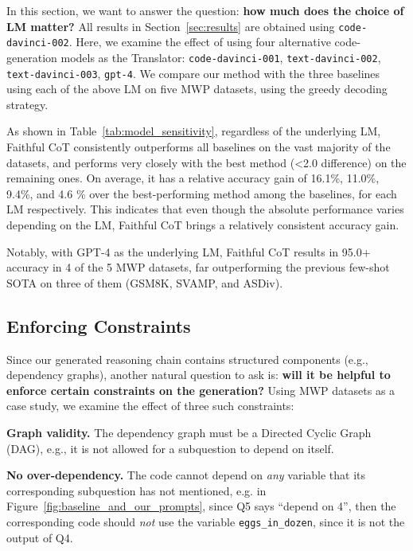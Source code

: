 \documentclass[11pt]{article}
\begin{document}
In this section, we want to answer the question: \textbf{how much does the choice of LM matter?} All results in Section~\ref{sec:results} are obtained using \texttt{code-davinci-002}. Here, we examine the effect of using four alternative code-generation models as the Translator: \texttt{code-davinci-001}, \texttt{text-davinci-002}, \texttt{text-davinci-003}, \texttt{gpt-4}. We compare our method with the three baselines using each of the above LM on five MWP datasets, using the greedy decoding strategy.


As shown in Table~\ref{tab:model_sensitivity}, regardless of the underlying LM, Faithful CoT consistently outperforms all baselines on the vast majority of the datasets, and performs very closely with the best method (<2.0 difference) on the remaining ones. On average, it has a relative accuracy gain of 16.1\%, 11.0\%, 9.4\%, and 4.6 \% over the best-performing method among the baselines, for each LM respectively. This indicates that even though the absolute performance varies depending on the LM, Faithful CoT brings a relatively consistent accuracy gain.

Notably, with GPT-4 as the underlying LM, Faithful CoT results in 95.0+ accuracy in 4 of the 5 MWP datasets, far outperforming the previous few-shot SOTA on three of them (GSM8K, SVAMP, and ASDiv).




\subsection{Enforcing Constraints}
\label{sec:appendix_constraint}

Since our generated reasoning chain contains structured components (e.g., dependency graphs), another natural question to ask is: \textbf{will it be helpful to enforce certain constraints on the generation?} Using MWP datasets as a case study, we examine the effect of three such constraints:

\textbf{Graph validity.} The dependency graph must be a Directed Cyclic Graph (DAG), e.g., it is not allowed for a subquestion to depend on itself.

\textbf{No over-dependency.} The code cannot depend on \textit{any} variable that its corresponding subquestion has not mentioned, e.g. in Figure~\ref{fig:baseline_and_our_prompts}, since Q5 says ``depend on 4'', then the corresponding code should \textit{not} use the variable \texttt{eggs\_in\_dozen}, since it is not the output of Q4.
\end{document}

